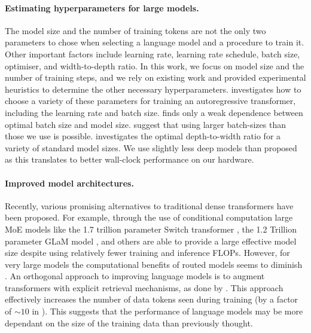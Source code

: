 \paragraph{Estimating hyperparameters for large models.} The model size and the number of training tokens are not the only two parameters to chose when selecting a language model and a procedure to train it. Other important factors include learning rate, learning rate schedule, batch size, optimiser, and width-to-depth ratio. In this work, we focus on model size and the number of training steps, and we rely on existing work and provided experimental heuristics to determine the other necessary hyperparameters.
\citet{yang2021tuning} investigates how to choose a variety of these parameters for training an autoregressive transformer, including the learning rate and batch size.
\citet{mccandlish2018empirical} finds only a weak dependence between optimal batch size and model size. \citet{shallue2018measuring, NEURIPS2019_e0eacd98} suggest that using larger batch-sizes than those we use is possible.
\citet{levine2020depth} investigates the optimal depth-to-width ratio for a variety of standard model sizes. We use slightly less deep models than proposed as this translates to better wall-clock performance on our hardware. 

\paragraph{Improved model architectures.} Recently, various promising alternatives to traditional dense transformers have been proposed. For example, through the use of conditional computation large MoE models like the 1.7 trillion parameter Switch transformer \citep{fedus2021switch}, the 1.2 Trillion parameter GLaM model \citep{du2021glam}, and others \citep{artetxe2021efficient, zoph2022designing} are able to provide a large effective model size despite using relatively fewer training and inference FLOPs. However, for very large models the computational benefits of routed models seems to diminish \citep{clark2022unified}. An orthogonal approach to improving language models is to augment transformers with explicit retrieval mechanisms, as done by \citet{borgeaud2021retrieval, guu2020realm, lewisretrieval2020}. This approach effectively increases the number of data tokens seen during training (by a factor of $\sim10$ in \citet{borgeaud2021retrieval}).
This suggests that the performance of language models may be more dependant on the size of the training data than previously thought.

